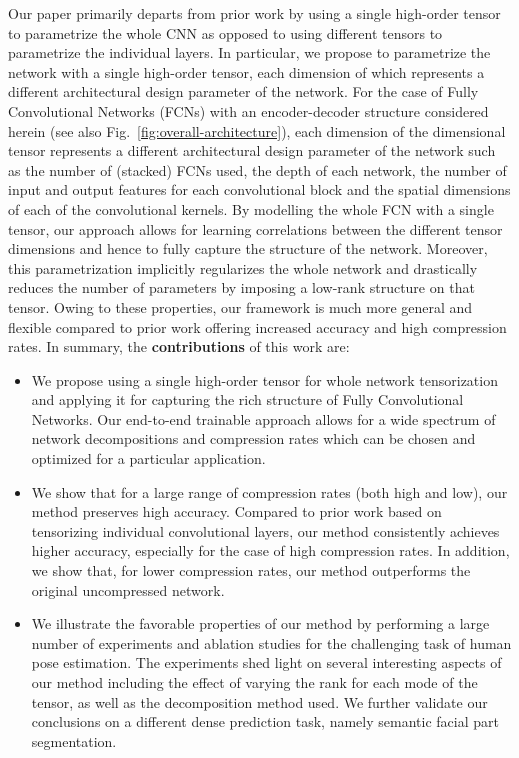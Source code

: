 \documentclass[10pt,twocolumn,letterpaper]{article}
\begin{document}
Our paper primarily departs from prior work by using a single high-order tensor to parametrize the whole CNN as opposed to using different tensors to parametrize the individual layers. In particular, we propose to parametrize the network with a single high-order tensor, each dimension of which represents a different architectural design parameter of the network. For the case of Fully Convolutional Networks (FCNs) with an encoder-decoder structure considered herein (see also Fig.~\ref{fig:overall-architecture}), each dimension of the dimensional tensor represents a different architectural design parameter of the network such as the number of (stacked) FCNs used, the depth of each network, the number of input and output features for each convolutional block and the spatial dimensions of each of the convolutional kernels. By modelling the whole FCN with a single tensor, our approach allows for learning correlations between the different tensor dimensions and hence to fully capture the structure of the network. Moreover, this parametrization implicitly regularizes the whole network and drastically reduces the number of parameters by imposing a low-rank structure on that tensor. Owing to these properties, our framework is much more general and flexible compared to prior work offering increased accuracy and high compression rates.
In summary, the \textbf{contributions} of this work are:
\begin{itemize}
    \item 
    We propose using a single high-order tensor for whole network tensorization and applying it for capturing the rich structure of Fully Convolutional Networks. Our end-to-end trainable approach allows for a wide spectrum of network decompositions and compression rates which can be chosen and optimized for a particular application.
    \item
    We show that for a large range of compression rates (both high and low), our method preserves high accuracy. Compared to prior work based on tensorizing individual convolutional layers, our method consistently achieves higher accuracy, especially for the case of high compression rates. In addition, we show that, for lower compression rates, our method outperforms the original uncompressed network.
    \item
    We illustrate the favorable properties of our method by performing a large number of experiments and ablation studies for the challenging task of human pose estimation. The experiments shed light on several interesting aspects of our method including the effect of varying the rank for each mode of the tensor, as well as the decomposition method used. We further validate our conclusions on a different dense prediction task, namely semantic facial part segmentation.
\end{itemize}
\end{document}
